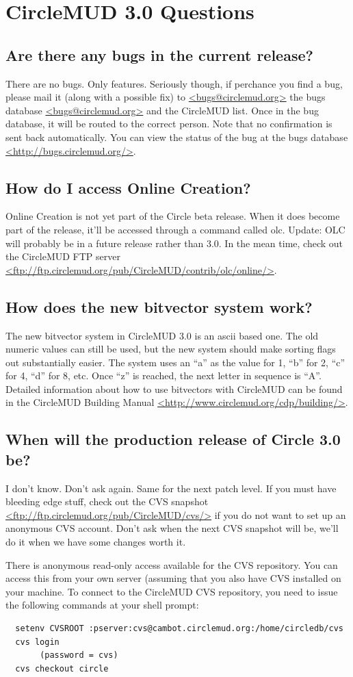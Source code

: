 \documentclass[11pt]{article}
\begin{document}
\section{CircleMUD 3.0 Questions}
\subsection{Are there any bugs in the current release?}
There are no bugs.  Only features.  Seriously though, if perchance you find a bug, please mail it (along with a possible fix) to \url{<bugs@circlemud.org>} the bugs database \url{<bugs@circlemud.org>} and the CircleMUD list.  Once in the bug database, it will be routed to the correct person.  Note that no confirmation is sent back automatically.  You can view the status of the bug at the bugs database \url{<http://bugs.circlemud.org/>}.
 
\subsection{How do I access Online Creation?}
Online Creation is not yet part of the Circle beta release. When it does become part of the release, it'll be accessed through a command called olc. Update: OLC will probably be in a future release rather than 3.0. In the mean time, check out the CircleMUD FTP server
\url{<ftp://ftp.circlemud.org/pub/CircleMUD/contrib/olc/online/>}.

\subsection{How does the new bitvector system work?}
The new bitvector system in CircleMUD 3.0 is an ascii based one. The old numeric values can still be used, but the new system should make sorting flags out substantially easier.  The system uses an ``a'' as the value for 1, ``b'' for 2, ``c'' for 4, ``d'' for 8, etc.  Once ``z'' is reached, the next letter in sequence is ``A''.  Detailed information about how to use bitvectors with CircleMUD can be found in the CircleMUD Building Manual \url{<http://www.circlemud.org/cdp/building/>}.

\subsection{When will the production release of Circle 3.0 be?}
I don't know.  Don't ask again.  Same for the next patch level.  If you must have bleeding edge stuff, check out the CVS snapshot \url{<ftp://ftp.circlemud.org/pub/CircleMUD/cvs/>} if you do not want to set up an anonymous CVS account.  Don't ask when the next CVS snapshot will be, we'll do it when we have some changes worth it.
\par
There is anonymous read-only access available for the CVS repository.  You can access this from your own server (assuming that you also have CVS installed on your machine.  To connect to the CircleMUD CVS repository, you need to issue the following commands at your shell prompt:
\begin{verbatim}
  setenv CVSROOT :pserver:cvs@cambot.circlemud.org:/home/circledb/cvs
  cvs login
       (password = cvs)
  cvs checkout circle
\end{verbatim}
\end{document}
